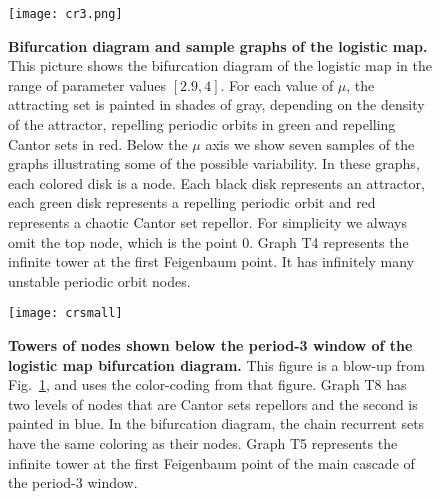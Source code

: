 \begin{figure}
 \centering
 \texttt{[image: cr3.png]}
  \caption{{\bf Bifurcation diagram and sample graphs of the logistic map.} 
  This picture shows the bifurcation diagram of the logistic map in the range of parameter values $[2.9,4]$.
  For each value of $\mu$, the attracting set is painted in shades of gray, depending on the density of the attractor, repelling periodic orbits in green and repelling Cantor sets in red. Below the $\mu$ axis we show seven samples of the graphs illustrating some of the possible variability. In these graphs, each colored disk is a node. Each black disk represents an attractor, each green disk represents a repelling periodic orbit and red represents a chaotic Cantor set repellor. For simplicity we always omit the top node, which is the point 0. Graph T4 represents the infinite tower at the first Feigenbaum point. It has infinitely many unstable periodic orbit nodes.
  }
  \label{fig:full}
\end{figure}


\begin{figure}
 \centering
 \texttt{[image: crsmall]}
 \caption{{\bf Towers of nodes shown below the period-3 window of the logistic map bifurcation diagram.}
    This figure is a blow-up from Fig.~\ref{fig:full}, and uses the color-coding from that figure. Graph T8 has two levels of nodes that are Cantor sets repellors and the second is painted in blue.
In the bifurcation diagram, the chain recurrent sets have the same coloring as their nodes. 
Graph T5 represents the infinite tower at the first Feigenbaum point of the main cascade of the period-3 window. 
}
 \label{fig:p3}
\end{figure} 
